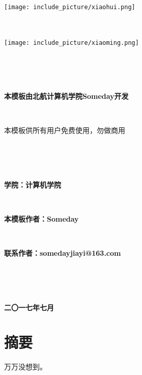 \documentclass{ctexart}
\newcommand{\erhao}{\fontsize{21pt}\selectfont}
\newcommand{\sanhao}{\fontsize{15.75pt}\selectfont}
\newcommand{\sihao}{\fontsize{14pt}\selectfont}
\newcommand{\xiaosihao}{\fontsize{12pt}\selectfont}
\begin{document}
\lhead{}%
\rhead{}%


\setcounter{secnumdepth}{0}%





\texttt{[image: include\_picture/xiaohui.png]}
\ \\ 
\ \\
\ \\
\begin{center}
\texttt{[image: include\_picture/xiaoming.png]}
\end{center}
\ \\
\ \\
\ \\
\erhao
\centerline{\textbf{本模板由北航计算机学院Someday开发}} %
\ \\
\centerline{本模板供所有用户免费使用，勿做商用}
\ \\
\ \\
\ \\
\sihao
\centerline{\textbf{学院：计算机学院}}
\ \\
\centerline{\textbf{本模板作者：Someday}}
\ \\
\centerline{\textbf{联系作者：somedayjiayi@163.com}}
\ \\
\ \\ 
\ \\
\sanhao
\centerline{\textbf{二〇一七年七月}}

\pagenumbering{} %
\renewcommand{\headrulewidth}{0pt}%


\clearpage


\xiaosihao
\section*{摘要}
万万没想到。
\end{document}
